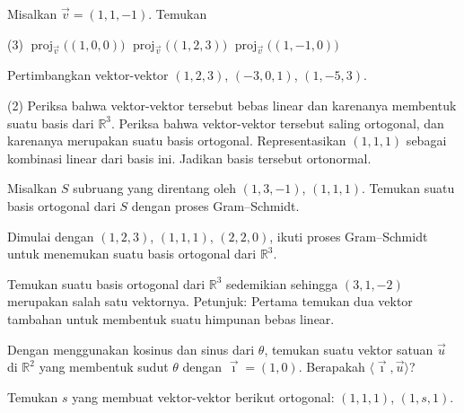 \begin{exercise}
Misalkan $\vec{v} = (1,1,-1)$. Temukan
\begin{tasks}(3)
\task $\operatorname{proj}_{\vec{v}}\bigl( (1,0,0) \bigr)$
\task $\operatorname{proj}_{\vec{v}}\bigl( (1,2,3) \bigr)$
\task $\operatorname{proj}_{\vec{v}}\bigl( (1,-1,0) \bigr)$
\end{tasks}
\end{exercise}

\begin{exercise}
\pagebreak[2]
Pertimbangkan vektor-vektor $(1,2,3)$, $(-3,0,1)$, $(1,-5,3)$.
\begin{tasks}(2)
\task Periksa bahwa vektor-vektor tersebut bebas linear dan karenanya membentuk suatu basis dari ${\mathbb{R}}^3$.
\task Periksa bahwa vektor-vektor tersebut saling ortogonal, dan karenanya
merupakan suatu basis ortogonal.
\task Representasikan $(1,1,1)$ sebagai kombinasi linear dari basis ini.
\task Jadikan basis tersebut ortonormal.
\end{tasks}
\end{exercise}

\begin{exercise}
Misalkan $S$ subruang yang direntang oleh
$(1,3,-1)$, $(1,1,1)$. Temukan suatu basis ortogonal dari $S$
dengan proses Gram--Schmidt.
\end{exercise}

\begin{exercise}
Dimulai dengan $(1,2,3)$, $(1,1,1)$, $(2,2,0)$, ikuti proses Gram--Schmidt
untuk menemukan suatu basis ortogonal dari ${\mathbb{R}}^3$.
\end{exercise}

\begin{exercise}
Temukan suatu basis ortogonal dari ${\mathbb{R}}^3$ sedemikian sehingga $(3,1,-2)$
merupakan salah satu vektornya. Petunjuk: Pertama temukan dua vektor tambahan untuk membentuk suatu
himpunan bebas linear.
\end{exercise}

\begin{exercise}
Dengan menggunakan kosinus dan sinus dari $\theta$, temukan suatu vektor satuan $\vec{u}$
di ${\mathbb{R}}^2$ yang
membentuk sudut $\theta$ dengan $\vec{\imath} = (1,0)$. Berapakah
$\langle \vec{\imath} , \vec{u} \rangle$?
\end{exercise}

\setcounter{exercise}{100}

\begin{exercise}
Temukan $s$ yang membuat vektor-vektor berikut ortogonal:
$(1,1,1)$, $(1,s,1)$.
\end{exercise}

